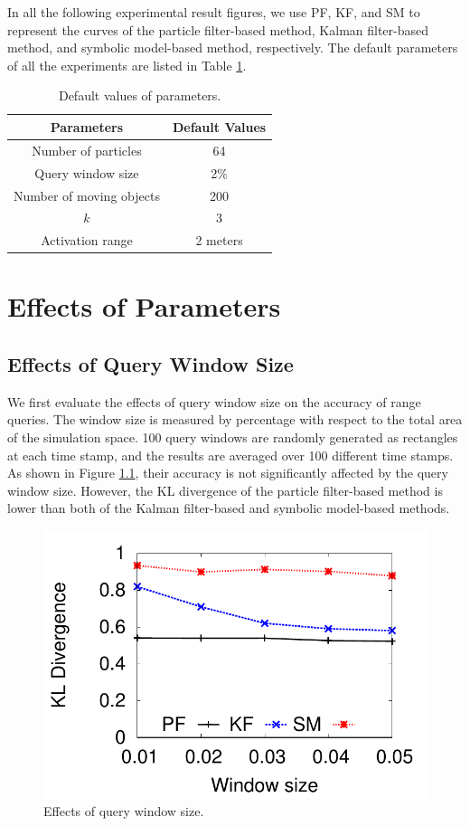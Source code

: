 \documentclass[12pt]{report}
\begin{document}
In all the following experimental result figures, we use PF, KF,
and SM to represent the curves of the particle filter-based method,
Kalman filter-based method, and symbolic model-based method,
respectively.  The default parameters of all the experiments are
listed in Table \ref{tab:default-values}.

\begin{table}[htbp]
\caption{\label{tab:default-values}
Default values of parameters.}
\centering
\begin{tabular}{c|c}
\hline
Parameters & Default Values\\
\hline
Number of particles & 64\\
Query window size & 2\%\\
Number of moving objects & 200\\
\(k\) & 3\\
Activation range & 2 meters\\
\hline
\end{tabular}
\end{table}

\chapter{Effects of Parameters}
\label{sec:org8919945}

\section{Effects of Query Window Size}
\label{sec:org8d195ee}

We first evaluate the effects of query window size on the accuracy
of range queries.  The window size is measured by percentage with
respect to the total area of the simulation space.  100 query
windows are randomly generated as rectangles at each time stamp,
and the results are averaged over 100 different time stamps.  As
shown in Figure \ref{fig:window-size}, their accuracy is not
significantly affected by the query window size.  However, the KL
divergence of the particle filter-based method is lower than both
of the Kalman filter-based and symbolic model-based methods.

\begin{figure}[htbp]
\centering
\includegraphics[width=.5\textwidth]{img/kl-w.pdf}
\caption{\label{fig:window-size}
Effects of query window size.}
\end{figure}
\end{document}
